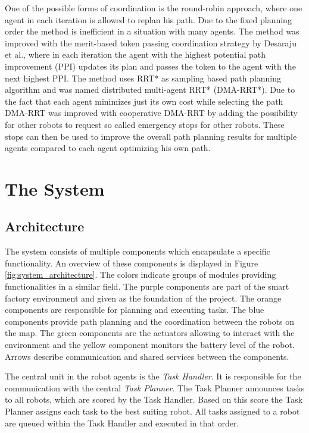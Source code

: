 \documentclass[journal]{IEEEtran}
\begin{document}
One of the possible forms of coordination is the round-robin approach, where one agent in each iteration is allowed to replan his path. Due to the fixed planning order the method is inefficient in a situation with many agents. The method was improved with the merit-based token passing coordination strategy by Desaraju et al.\cite{DMA}, where in each iteration the agent with the highest potential path improvement (PPI) updates its plan and passes the token to the agent with the next highest PPI. The method uses  RRT* as sampling based path planning algorithm and was named distributed multi-agent RRT* (DMA-RRT*). Due to the fact that each agent minimizes just its own cost while selecting the path DMA-RRT was improved with cooperative DMA-RRT\cite{DMA} by adding the possibility for other robots to request so called emergency stops for other robots. These stops can then be used to improve the overall path planning results for multiple agents compared to each agent optimizing his own path.

\section{The System}
\label{sec:methodology}


\subsection{Architecture}
\label{subsec:architecture}
The system consists of multiple components which encapsulate a specific functionality. An overview of these components is displayed in Figure \ref{fig:system_architecture}. The colors indicate groups of modules providing functionalities in a similar field. The purple components are part of the smart factory environment and given as the foundation of the project. The orange components are responsible for planning and executing tasks. The blue components provide path planning and the coordination between the robots on the map. The green components are the actuators allowing to interact with the environment and the yellow component monitors the battery level of the robot. Arrows describe communication and shared services between the components.

The central unit in the robot agents is the \emph{Task Handler}. It is responsible for the communication with the central \emph{Task Planner}. The Task Planner announces tasks to all robots, which are scored by the Task Handler. Based on this score the Task Planner assigns each task to the best suiting robot. All tasks assigned to a robot are queued within the Task Handler and executed in that order.
\end{document}
